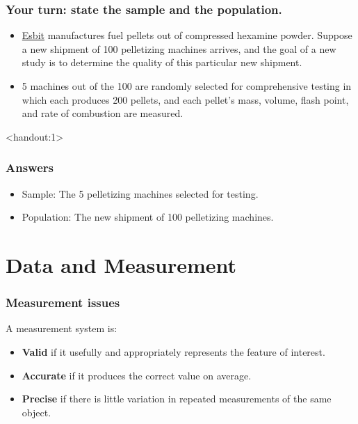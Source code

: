 \documentclass[handout]{beamer}
\newcommand{\answers}{1}
\numberwithin{equation}{section}
\begin{document}
\begin{frame}
\frametitle{Your turn: state the sample and the population.} \small
\begin{itemize}
\item \href{http://www.esbit.net/}{Esbit} manufactures fuel pellets out of compressed hexamine powder. Suppose a new shipment of 100 pelletizing machines arrives, and the goal of a new study is to determine the quality of this particular new shipment. 
\pause \item 5 machines out of the 100 are randomly selected for comprehensive testing in which each produces 200 pellets, and each pellet's mass, volume, flash point, and rate of combustion are measured.
\end{itemize}
\end{frame}

\begin{frame}<handout:\answers>
\frametitle{Answers}
\begin{itemize}
\item Sample: The 5 pelletizing machines selected for testing.
\pause \item Population: The new shipment of 100 pelletizing machines.
\end{itemize}
\end{frame}







\section{Data and Measurement}

\begin{frame}
\frametitle{Measurement issues}

A measurement system is:
\begin{itemize}
\item {\bf Valid} if it usefully and appropriately represents the feature  of interest.
\pause \item {\bf Accurate} if it produces the correct value on average. 
\pause \item {\bf Precise} if there is little variation in repeated measurements of the same object. 
\end{itemize}
\end{frame}
\end{document}
